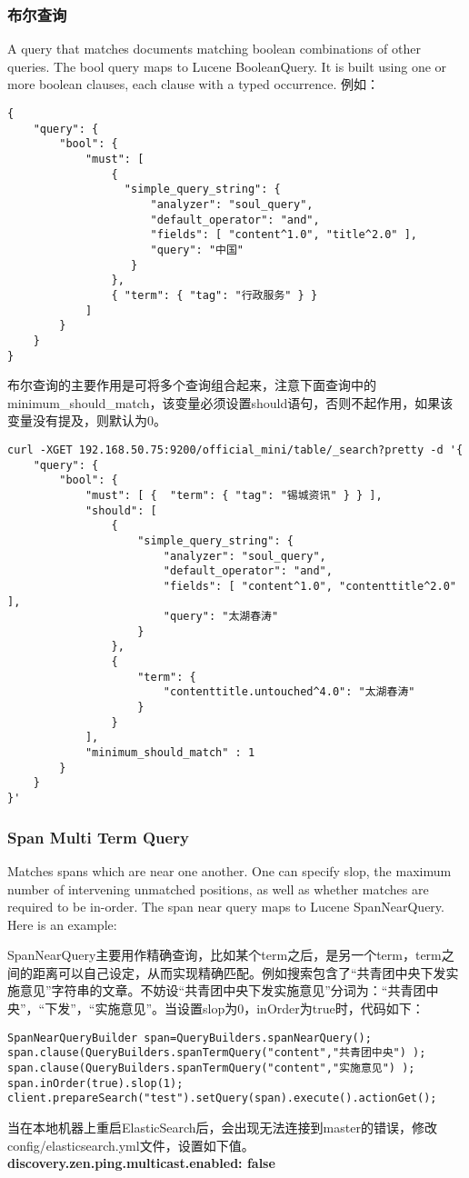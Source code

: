 \subsubsection{布尔查询}
A query that matches documents matching boolean combinations of other queries. The bool query maps to Lucene BooleanQuery. It is built using one or more boolean clauses, each clause with a typed occurrence. 例如：
\begin{verbatim}
{
    "query": {
        "bool": {
            "must": [
                {
                  "simple_query_string": {
                      "analyzer": "soul_query", 
                      "default_operator": "and", 
                      "fields": [ "content^1.0", "title^2.0" ], 
                      "query": "中国"
                   }
                }, 
                { "term": { "tag": "行政服务" } }
            ]
        }
    } 
}
\end{verbatim}
\par 布尔查询的主要作用是可将多个查询组合起来，注意下面查询中的minimum\_should\_match，该变量必须设置should语句，否则不起作用，如果该变量没有提及，则默认为0。
\begin{verbatim}
curl -XGET 192.168.50.75:9200/official_mini/table/_search?pretty -d '{
    "query": {
        "bool": {
            "must": [ {  "term": { "tag": "锡城资讯" } } ], 
            "should": [
                {
                    "simple_query_string": {
                        "analyzer": "soul_query", 
                        "default_operator": "and", 
                        "fields": [ "content^1.0", "contenttitle^2.0" ], 
                        "query": "太湖春涛"
                    }
                }, 
                {
                    "term": {
                        "contenttitle.untouched^4.0": "太湖春涛"
                    }
                }
            ], 
            "minimum_should_match" : 1
        }
    } 
}'
\end{verbatim}
\subsubsection{Span Multi Term Query}
Matches spans which are near one another. One can specify slop, the maximum number of intervening unmatched positions, as well as whether matches are required to be in-order. The span near query maps to Lucene SpanNearQuery. Here is an example:
\par SpanNearQuery主要用作精确查询，比如某个term之后，是另一个term，term之间的距离可以自己设定，从而实现精确匹配。例如搜索包含了“共青团中央下发实施意见”字符串的文章。不妨设“共青团中央下发实施意见”分词为：“共青团中央”，“下发”，“实施意见”。当设置slop为0，inOrder为true时，代码如下：
\begin{verbatim}
SpanNearQueryBuilder span=QueryBuilders.spanNearQuery();
span.clause(QueryBuilders.spanTermQuery("content","共青团中央") );
span.clause(QueryBuilders.spanTermQuery("content","实施意见") );
span.inOrder(true).slop(1);
client.prepareSearch("test").setQuery(span).execute().actionGet();
\end{verbatim}
\par 当在本地机器上重启ElasticSearch后，会出现无法连接到master的错误，修改config/elasticsearch.yml文件，设置如下值。\textbf{discovery.zen.ping.multicast.enabled: false}
